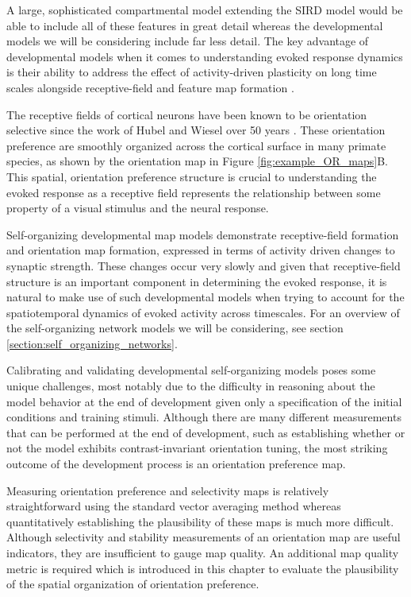 \documentclass[phd,ianc,twoside]{infthesis}
\begin{document}
A large, sophisticated compartmental model extending the SIRD model
would be able to include all of these features in great detail whereas
the developmental models we will be considering include far less
detail. The key advantage of developmental models when it comes to
understanding evoked response dynamics is their ability to address the
effect of activity-driven plasticity on long time scales alongside
receptive-field and feature map formation \citep{bednar_jpp12}.

The receptive fields of cortical neurons have been known to be
orientation selective since the work of Hubel and Wiesel over 50 years
\citep{hubel_jphysio59}. These orientation preference are smoothly
organized across the cortical surface in many primate species, as shown
by the orientation map in Figure \ref{fig:example_OR_maps}B. This
spatial, orientation preference structure is crucial to understanding
the evoked response as a receptive field represents the relationship
between some property of a visual stimulus and the neural response.

Self-organizing developmental map models demonstrate receptive-field
formation and orientation map formation, expressed in terms of activity
driven changes to synaptic strength. These changes occur very slowly and
given that receptive-field structure is an important component in
determining the evoked response, it is natural to make use of such
developmental models when trying to account for the spatiotemporal
dynamics of evoked activity across timescales. For an overview of the
self-organizing network models we will be considering, see section
\ref{section:self_organizing_networks}.

Calibrating and validating developmental self-organizing models poses
some unique challenges, most notably due to the difficulty in reasoning
about the model behavior at the end of development given only a
specification of the initial conditions and training stimuli. Although
there are many different measurements that can be performed at the end
of development, such as establishing whether or not the model exhibits
contrast-invariant orientation tuning, the most striking outcome of
the development process is an orientation preference map.

Measuring orientation preference and selectivity maps is relatively
straightforward using the standard vector averaging method
\citep{miikkulainen_2005,blasdel_nature86} whereas quantitatively
establishing the plausibility of these maps is much more
difficult. Although selectivity and stability measurements of an
orientation map are useful indicators, they are insufficient to gauge
map quality. An additional map quality metric is required which is
introduced in this chapter to evaluate the plausibility of the spatial
organization of orientation preference.
\end{document}
